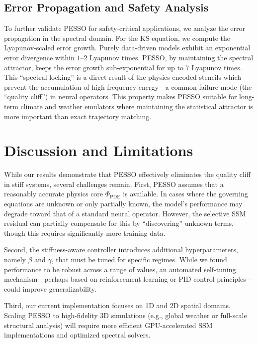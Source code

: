 \documentclass{article}
\theoremstyle{plain}
\theoremstyle{definition}
\theoremstyle{remark}
\begin{document}
\subsection{Error Propagation and Safety Analysis}

To further validate PESSO for safety-critical applications, we analyze the error propagation in the spectral domain. For the KS equation, we compute the Lyapunov-scaled error growth. Purely data-driven models exhibit an exponential error divergence within $1\text{--}2$ Lyapunov times. PESSO, by maintaining the spectral attractor, keeps the error growth sub-exponential for up to 7 Lyapunov times. This ``spectral locking'' is a direct result of the physics-encoded stencils which prevent the accumulation of high-frequency energy—a common failure mode (the ``quality cliff'') in neural operators. This property makes PESSO suitable for long-term climate and weather emulators where maintaining the statistical attractor is more important than exact trajectory matching.



\section{Discussion and Limitations}
\label{sec:discussion}

While our results demonstrate that PESSO effectively eliminates the quality cliff in stiff systems, several challenges remain. First, PESSO assumes that a reasonably accurate physics core $\Phi_{\text{PDE}}$ is available. In cases where the governing equations are unknown or only partially known, the model's performance may degrade toward that of a standard neural operator. However, the selective SSM residual can partially compensate for this by ``discovering'' unknown terms, though this requires significantly more training data.

Second, the stiffness-aware controller introduces additional hyperparameters, namely $\beta$ and $\gamma$, that must be tuned for specific regimes. While we found performance to be robust across a range of values, an automated self-tuning mechanism—perhaps based on reinforcement learning or PID control principles—could improve generalizability. 

Third, our current implementation focuses on 1D and 2D spatial domains. Scaling PESSO to high-fidelity 3D simulations (e.g., global weather or full-scale structural analysis) will require more efficient GPU-accelerated SSM implementations and optimized spectral solvers.
\end{document}
